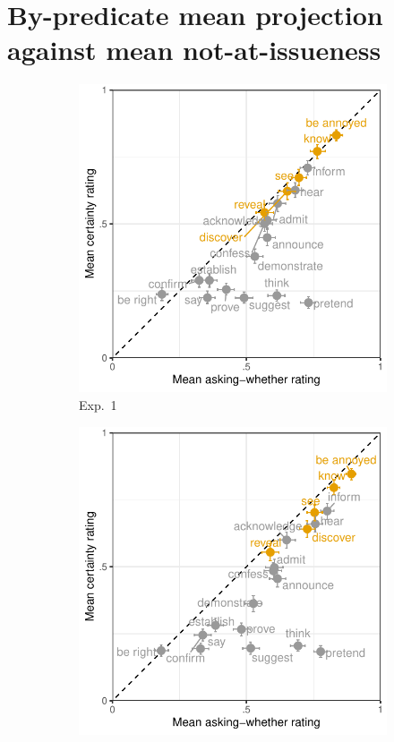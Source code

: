 \documentclass[11pt,fleqn]{article}
\newcommand{\6}{\mbox{$[\hspace*{-.6mm}[$}}
\newcommand{\9}{\mbox{$]\hspace*{-.6mm}]$}}
\begin{document}
\newpage

\section{By-predicate mean projection against mean not-at-issueness}\label{a-proj-by-ai}

\begin{figure}[h!]
\centering
\begin{subfigure}[t]{.49\textwidth}
\centering
\includegraphics[width=\textwidth]{../../results/exp1/graphs/SUP-mean-projection-by-mean-ai}
\caption{Exp.~1}\label{fig:prior-exp1-expDT1}
\end{subfigure} \hfill \begin{subfigure}[t]{.49\textwidth}
\centering
\includegraphics[width=\textwidth]{../../results/exp2/graphs/SUP-mean-projection-by-mean-ai}

\end{subfigure}
\end{figure}
\end{document}
